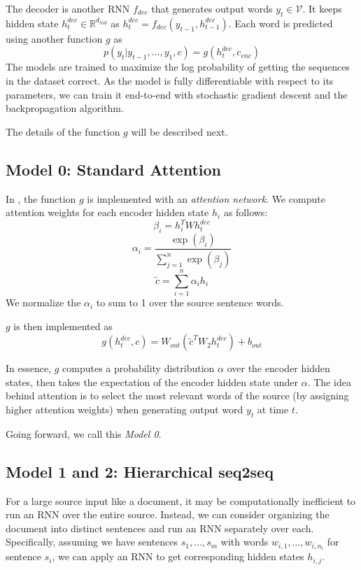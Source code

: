 \documentclass[11pt]{report}
\begin{document}

The decoder is another RNN $f_{dec}$ that generates output words $y_t \in \mathcal{V}$. It keeps hidden state $h_t^{dec} \in \mathbb{R}^{d_{hid}}$ as $h_t^{dec} = f_{dec}(y_{t-1}, h_{t-1}^{dec})$. Each word is predicted using another function $g$ as
$$p(y_t | y_{t-1}, \ldots, y_1, c) = g(h_t^{dec}, c_{enc})$$
The models are trained to maximize the log probability of getting the sequences in the dataset correct. As the model is fully differentiable with respect to its parameters, we can train it end-to-end with stochastic gradient descent and the backpropagation algorithm.

The details of the function $g$ will be described next.

\subsection{Model 0: Standard Attention}

In \cite{bahdanau2014neural}, the function $g$ is implemented with an \emph{attention network}. We compute attention weights for each encoder hidden state $h_i$ as follows:
$$\beta_i = h_i^T W h_t^{dec}$$
$$\alpha_i = \frac{\exp(\beta_i)}{\sum_{j=1}^n \exp(\beta_j)}$$
$$\widetilde{c} = \sum_{i=1}^n \alpha_i h_i$$
We normalize the $\alpha_i$ to sum to 1 over the source sentence words.

$g$ is then implemented as
$$g(h_t^{dec}, c) = W_{out}(\widetilde{c}^T W_2 h_t^{dec}) + b_{out}$$

In essence, $g$ computes a probability distribution $\alpha$ over the encoder hidden states, then takes the expectation of the encoder hidden state under $\alpha$. The idea behind attention is to select the most relevant words of the source (by assigning higher attention weights) when generating output word $y_t$ at time $t$.

Going forward, we call this \emph{Model 0}.

\subsection{Model 1 and 2: Hierarchical seq2seq}

For a large source input like a document, it may be computationally inefficient to run an RNN over the entire source. Instead, we can consider organizing the document into distinct sentences and run an RNN separately over each. Specifically, assuming we have sentences $s_1, \ldots, s_m$ with words $w_{i,1}, \ldots, w_{i,n_i}$ for sentence $s_i$, we can apply an RNN to get corresponding hidden states $h_{i,j}$.
\end{document}
